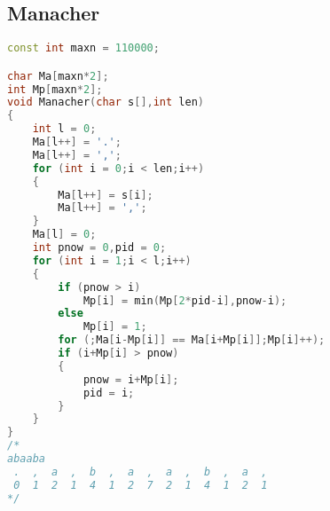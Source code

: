 \subsection{Manacher}
	\begin{lstlisting}[language=c++]
const int maxn = 110000;

char Ma[maxn*2];
int Mp[maxn*2];
void Manacher(char s[],int len)
{
	int l = 0;
	Ma[l++] = '.';
	Ma[l++] = ',';
	for (int i = 0;i < len;i++)
	{
		Ma[l++] = s[i];
		Ma[l++] = ',';
	}
	Ma[l] = 0;
	int pnow = 0,pid = 0;
	for (int i = 1;i < l;i++)
	{
		if (pnow > i)
			Mp[i] = min(Mp[2*pid-i],pnow-i);
		else
			Mp[i] = 1;
		for (;Ma[i-Mp[i]] == Ma[i+Mp[i]];Mp[i]++);
		if (i+Mp[i] > pnow)
		{
			pnow = i+Mp[i];
			pid = i;
		}
	}
}
/*
abaaba    
 .  ,  a  ,  b  ,  a  ,  a  ,  b  ,  a  , 
 0  1  2  1  4  1  2  7  2  1  4  1  2  1 
*/
	\end{lstlisting}